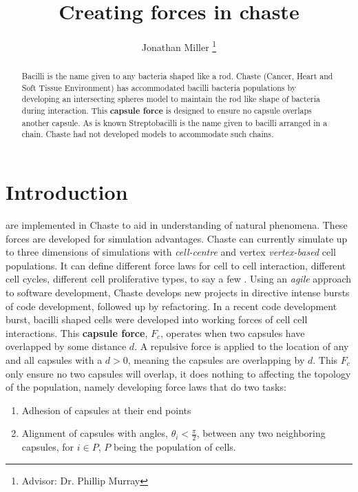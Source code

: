 \documentclass[journal, a4paper]{IEEEtran}
\begin{document}
	\title{Creating forces in chaste}
	\author{Jonathan Miller
	\thanks{Advisor: Dr. Phillip Murray}}
	\maketitle

\begin{abstract}
	 Bacilli is the name given to any bacteria shaped like a rod. Chaste (Cancer, Heart and Soft Tissue Environment) has accommodated bacilli bacteria populations by developing an intersecting spheres model to maintain the rod like shape of bacteria during interaction. This \textbf{capsule force} is designed to ensure no capsule overlaps another capsule. As is known Streptobacilli is the name given to bacilli arranged in a chain. Chaste had not developed models to accommodate such chains.
\end{abstract}

\section{Introduction}
	 are implemented in Chaste to aid in understanding of natural phenomena. These forces are developed for simulation advantages. Chaste can currently simulate up to three dimensions of simulations with \textit{cell-centre} and vertex \textit{vertex-based} cell populations. It can define different force laws for cell to cell interaction, different cell cycles, different cell proliferative types, to say a few \cite{ChasteCell}. Using an \textit{agile} approach to software development, Chaste develops new projects in directive intense bursts of code development, followed up by refactoring. In a recent code development burst, bacilli shaped cells were developed into working forces of cell cell interactions. This \textbf{capsule force}, $F_c$, operates when two capsules have overlapped by some distance $d$. A repulsive force is applied to the location of any and all capsules with a $d > 0$, meaning the capsules are overlapping by $d$. This $F_c$ only ensure no two capsules will overlap, it does nothing to affecting the topology of the population, namely developing force laws that do two tasks:
	\begin{enumerate}
	    \item Adhesion of capsules at their end points
	    \item Alignment of capsules with angles, $\theta_i < \frac{\pi}{2}$, between any two neighboring capsules, for $i\in P$, $P$ being the population of cells.
	\end{enumerate}
\end{document}
